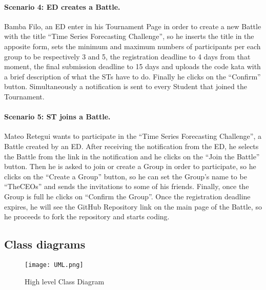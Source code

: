 \paragraph{Scenario 4: ED creates a Battle.}
Bamba Filo, an ED enter in his Tournament Page in order to create a new Battle with the title “Time Series Forecasting Challenge”, so he inserts the title in the apposite form, sets the minimum and maximum numbers of participants per each group to be respectively 3 and 5, the registration deadline to 4 days from that moment, the final submission deadline to 15 days and uploads the code kata with a brief description of what the STs have to do. Finally he clicks on the “Confirm” button. Simultaneously a notification is sent to every Student that joined the Tournament.

\paragraph{Scenario 5: ST joins a Battle.}
Mateo Retegui wants to participate in the “Time Series Forecasting Challenge”, a Battle created by an ED. After receiving the notification from the ED, he selects the Battle from the link in the notification and he clicks on the “Join the Battle” button. Then he is asked to join or create a Group in order to participate, so he clicks on the “Create a Group'' button, so he can set the Group’s name to be “TheCEOs” and sends the invitations to some of his friends. Finally, once the Group is full he clicks on “Confirm the Group”. Once the registration deadline expires, he will see the GitHub Repository link on the main page of the Battle, so he proceeds to fork the repository and starts coding.



\subsection{Class diagrams}
\label{subsec:class_diagrams}%


\begin{figure}[H]
    \begin{center}
        \texttt{[image: UML.png]}
        \caption{High level Class Diagram}
        \label{fig:UML}%
    \end{center}
\end{figure}

